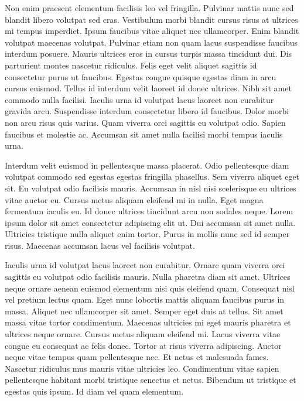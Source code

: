 \documentclass[11pt,a4paper]{article}
\begin{document}
Non enim praesent elementum facilisis leo vel fringilla. Pulvinar mattis nunc sed blandit libero volutpat sed cras. Vestibulum morbi blandit cursus risus at ultrices mi tempus imperdiet. Ipsum faucibus vitae aliquet nec ullamcorper. Enim blandit volutpat maecenas volutpat. Pulvinar etiam non quam lacus suspendisse faucibus interdum posuere. Mauris ultrices eros in cursus turpis massa tincidunt dui. Dis parturient montes nascetur ridiculus. Felis eget velit aliquet sagittis id consectetur purus ut faucibus. Egestas congue quisque egestas diam in arcu cursus euismod. Tellus id interdum velit laoreet id donec ultrices. Nibh sit amet commodo nulla facilisi. Iaculis urna id volutpat lacus laoreet non curabitur gravida arcu. Suspendisse interdum consectetur libero id faucibus. Dolor morbi non arcu risus quis varius. Quam viverra orci sagittis eu volutpat odio. Sapien faucibus et molestie ac. Accumsan sit amet nulla facilisi morbi tempus iaculis urna.

Interdum velit euismod in pellentesque massa placerat. Odio pellentesque diam volutpat commodo sed egestas egestas fringilla phasellus. Sem viverra aliquet eget sit. Eu volutpat odio facilisis mauris. Accumsan in nisl nisi scelerisque eu ultrices vitae auctor eu. Cursus metus aliquam eleifend mi in nulla. Eget magna fermentum iaculis eu. Id donec ultrices tincidunt arcu non sodales neque. Lorem ipsum dolor sit amet consectetur adipiscing elit ut. Dui accumsan sit amet nulla. Ultricies tristique nulla aliquet enim tortor. Purus in mollis nunc sed id semper risus. Maecenas accumsan lacus vel facilisis volutpat.

Iaculis urna id volutpat lacus laoreet non curabitur. Ornare quam viverra orci sagittis eu volutpat odio facilisis mauris. Nulla pharetra diam sit amet. Ultrices neque ornare aenean euismod elementum nisi quis eleifend quam. Consequat nisl vel pretium lectus quam. Eget nunc lobortis mattis aliquam faucibus purus in massa. Aliquet nec ullamcorper sit amet. Semper eget duis at tellus. Sit amet massa vitae tortor condimentum. Maecenas ultricies mi eget mauris pharetra et ultrices neque ornare. Cursus metus aliquam eleifend mi. Lacus viverra vitae congue eu consequat ac felis donec. Tortor at risus viverra adipiscing. Auctor neque vitae tempus quam pellentesque nec. Et netus et malesuada fames. Nascetur ridiculus mus mauris vitae ultricies leo. Condimentum vitae sapien pellentesque habitant morbi tristique senectus et netus. Bibendum ut tristique et egestas quis ipsum. Id diam vel quam elementum.
\end{document}
